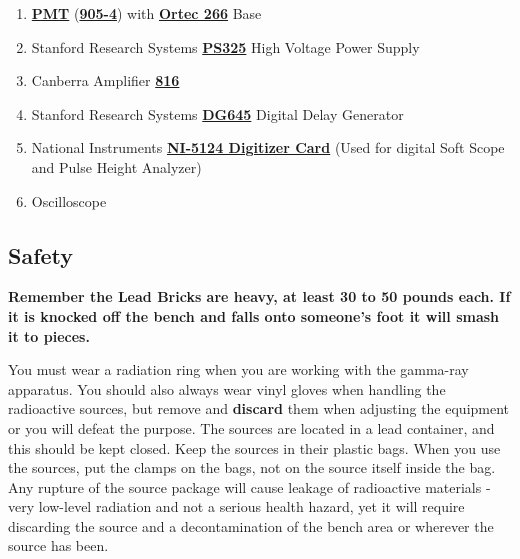 \documentclass{../lab}
\begin{document}
\begin{enumerate}
    \item \href{http://physics111.lib.berkeley.edu/Physics111/Reprints/GMA/905-series-nai-radiation-detectors.pdf}{\textbf{PMT}} (\href{http://experimentationlab.berkeley.edu/sites/default/files/images/905-4.pdf}{\textbf{905-4}}) with \href{http://experimentationlab.berkeley.edu/sites/default/files/images/266.pdf}{\textbf{Ortec 266}} Base
    
    \item Stanford Research Systems  \href{http://physics111.lib.berkeley.edu/Physics111/Equipment_Manuals/GMA/PS325m.pdf}{\textbf{PS325}} High Voltage Power Supply

    \item Canberra Amplifier  \href{http://physics111.lib.berkeley.edu/Physics111/Reprints/GMA/GMA\%20OCR\%20Canberra\%20spectroscopy\%20amp\%20816.pdf}{\textbf{816}}

    \item Stanford Research Systems  \href{http://physics111.lib.berkeley.edu/Physics111/Equipment_Manuals/GMA/DG645m.pd}{\textbf{DG645}} Digital Delay Generator

    \item National Instruments \href{http://physics111.lib.berkeley.edu/Physics111/Equipment_Manuals/GMA/NI-5124.pdf}{\textbf{NI-5124 Digitizer Card}} (Used for digital Soft Scope and Pulse Height Analyzer)

    \item Oscilloscope

\end{enumerate}

\subsection{Safety}

\textbf{Remember the Lead Bricks are heavy, at least 30 to 50 pounds each. If it is knocked off the bench and falls onto someone's foot it will smash it to pieces.}

You must wear a radiation ring when you are working with the gamma-ray apparatus. You should also always wear vinyl gloves when handling the radioactive sources, but remove and \textbf{discard} them when adjusting the equipment or you will defeat the purpose. The sources are located in a lead container, and this should be kept closed. Keep the sources in their plastic bags. When you use the sources, put the clamps on the bags, not on the source itself inside the bag. Any rupture of the source package will cause leakage of radioactive materials - very low-level radiation and not a serious health hazard, yet it will require discarding the source and a decontamination of the bench area or wherever the source has been.
\end{document}
